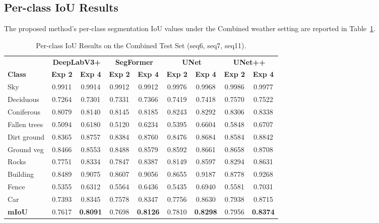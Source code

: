 \documentclass[journal,compsoc]{IEEEtran}
\begin{document}
\subsection{Per-class IoU Results}
The proposed method's per-class segmentation IoU values under the Combined weather setting are reported in Table~\ref{tab:per_class_iou}.

\begin{table}[t]
\centering
\caption{Per-class IoU Results on the Combined Test Set (seq6, seq7, seq11).}
\label{tab:per_class_iou}
\small
\begin{tabular}{lcccccccc}
\toprule
 & \multicolumn{2}{c}{\textbf{DeepLabV3+}} & \multicolumn{2}{c}{\textbf{SegFormer}} & \multicolumn{2}{c}{\textbf{UNet}} & \multicolumn{2}{c}{\textbf{UNet++}} \\
\cmidrule(lr){2-3} \cmidrule(lr){4-5} \cmidrule(lr){6-7} \cmidrule(lr){8-9}
\textbf{Class} & \textbf{Exp 2} & \textbf{Exp 4} & \textbf{Exp 2} & \textbf{Exp 4} & \textbf{Exp 2} & \textbf{Exp 4} & \textbf{Exp 2} & \textbf{Exp 4} \\
\midrule
Sky                & 0.9911 & 0.9914 & 0.9912 & 0.9912 & 0.9976 & 0.9968 & 0.9986 & 0.9977 \\
Deciduous          & 0.7264 & 0.7301 & 0.7331 & 0.7366 & 0.7419 & 0.7418 & 0.7570 & 0.7522 \\
Coniferous         & 0.8079 & 0.8140 & 0.8145 & 0.8185 & 0.8243 & 0.8292 & 0.8306 & 0.8338 \\
Fallen trees       & 0.5094 & 0.6180 & 0.5120 & 0.6234 & 0.5395 & 0.6604 & 0.5848 & 0.6707 \\
Dirt ground        & 0.8365 & 0.8757 & 0.8384 & 0.8760 & 0.8476 & 0.8684 & 0.8584 & 0.8842 \\
Ground veg         & 0.8466 & 0.8553 & 0.8488 & 0.8579 & 0.8592 & 0.8661 & 0.8658 & 0.8708 \\
Rocks              & 0.7751 & 0.8334 & 0.7847 & 0.8387 & 0.8149 & 0.8597 & 0.8294 & 0.8631 \\
Building           & 0.8489 & 0.9075 & 0.8607 & 0.9056 & 0.8655 & 0.9187 & 0.8778 & 0.9268 \\
Fence              & 0.5355 & 0.6312 & 0.5564 & 0.6436 & 0.5435 & 0.6940 & 0.5581 & 0.7031 \\
Car                & 0.7393 & 0.8345 & 0.7578 & 0.8347 & 0.7756 & 0.8630 & 0.7938 & 0.8715 \\
\midrule
\textbf{mIoU}      & 0.7617 & \textbf{0.8091} & 0.7698 & \textbf{0.8126} & 0.7810 & \textbf{0.8298} & 0.7956 & \textbf{0.8374} \\
\bottomrule
\end{tabular}
\end{table}
\end{document}
